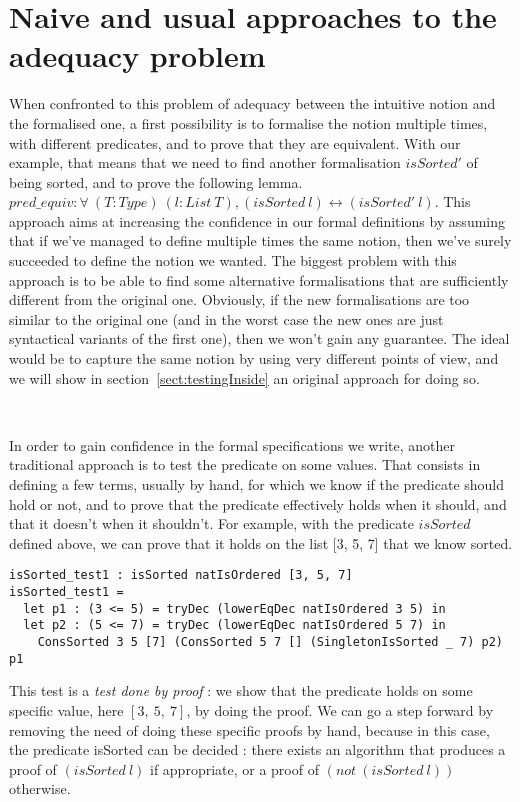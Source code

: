 \section{Naive and usual approaches to the adequacy problem}

\label{sect:naiveApproaches}


When confronted to this problem of adequacy between the intuitive notion and the formalised one, a first possibility is to formalise the notion multiple times, with different predicates, and to prove that they are equivalent.
With our example, that means that we need to find another formalisation $isSorted'$ of being sorted, and to prove the following lemma.
$pred\_equiv : \forall\ (T:Type)\ (l:List\ T), (isSorted\ l) \leftrightarrow (isSorted'\ l)$.
This approach aims at increasing the confidence in our formal definitions by assuming that if we've managed to define multiple times the same notion, then we've surely succeeded to define the notion we wanted. The biggest problem with this approach is to be able to find some alternative formalisations that are sufficiently different from the original one. Obviously, if the new formalisations are too similar to the original one (and in the worst case the new ones are just syntactical variants of the first one), then we won't gain any guarantee. The ideal would be to capture the same notion by using very different points of view, and we will show in section~\ref{sect:testingInside} an original approach for doing so.

\

In order to gain confidence in the formal specifications we write, another traditional approach is to test the predicate on some values. That consists in defining a few terms, usually by hand, for which we know if the predicate should hold or not, and to prove that the predicate effectively holds when it should, and that it doesn't when it shouldn't. For example, with the predicate $isSorted$ defined above, we can prove that it holds on the list [3, 5, 7] that we know sorted.

\begin{lstlisting}
isSorted_test1 : isSorted natIsOrdered [3, 5, 7]
isSorted_test1 = 
  let p1 : (3 <= 5) = tryDec (lowerEqDec natIsOrdered 3 5) in
  let p2 : (5 <= 7) = tryDec (lowerEqDec natIsOrdered 5 7) in
    ConsSorted 3 5 [7] (ConsSorted 5 7 [] (SingletonIsSorted _ 7) p2) p1
\end{lstlisting}
This test is a \emph{test done by proof} : we show that the predicate holds on some specific value, here $[3,\ 5,\ 7]$, by doing the proof. We can go a step forward by removing the need of doing these specific proofs by hand, because in this case, the predicate isSorted can be decided : there exists an algorithm that produces a proof of $(isSorted\ l)$ if appropriate, or a proof of $(not\ (isSorted\ l))$ otherwise.

